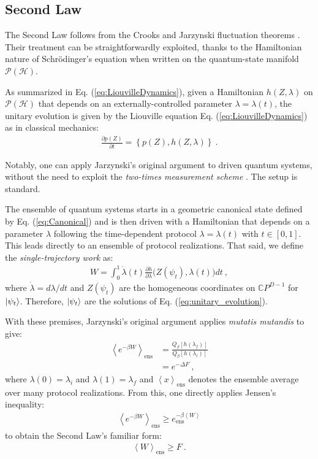 \documentclass[draft,nofootinbib,pre,twocolumn,showpacs,showkeys,groupaddress,preprintnumbers,floatfix]{revtex4-1}
\newcommand{\1}{\mathbbm{1}}
\newcommand{\MV}[1]{\left\langle #1 \right\rangle}
\newcommand{\PH}{\mathcal{P}(\mathcal{H})}
\begin{document}
\subsection{Second Law}

The Second Law follows from the Crooks \cite{Crooks1999a} and Jarzynski
\cite{Jarzynski2011} fluctuation theorems
\cite{Campisi,Klages2013,Deffner2019}. Their treatment can be straightforwardly
exploited, thanks to the Hamiltonian nature of Schr\"odinger's equation when
written on the quantum-state manifold $\PH$.

As summarized in Eq. (\ref{eq:LiouvilleDynamics}), given a Hamiltonian
$h(Z,\lambda)$ on $\PH$ that depends on an externally-controlled parameter
$\lambda = \lambda(t)$, the unitary evolution is given by the Liouville
equation Eq. (\ref{eq:LiouvilleDynamics}) as in classical mechanics:
\begin{align*}
\frac{\partial p(Z)}{\partial t} = \left\{p(Z) , h(Z,\lambda) \right\}
  ~.
\end{align*}

Notably, one can apply Jarzynski's original argument \cite{Jarzynski1997} to
driven quantum systems, without the need to exploit the \emph{two-times
measurement scheme} \cite{Deffner2019}. The setup is standard.

The ensemble of quantum systems starts in a geometric canonical state defined
by Eq. (\ref{eq:Canonical}) and is then driven with a Hamiltonian that depends
on a parameter $\lambda$ following the time-dependent protocol
$\lambda=\lambda(t)$ with $t \in [0,1]$. This leads directly to an ensemble of
protocol realizations. That said, we define the \emph{single-trajectory work}
as:
\begin{align*}
W = \int_{0}^{1} \dot{\lambda}(t) \frac{\partial h}{\partial \lambda}
 \big( Z(\psi_t),\lambda(t) \big)dt
  ~,
\end{align*}
where $\dot{\lambda} = d \lambda / dt$ and $Z(\psi_t)$ are the homogeneous
coordinates on $\mathbb{C}P^{D-1}$ for $\ket{\psi_t}$. Therefore,
$\ket{\psi_t}$ are the solutions of Eq. (\ref{eq:unitary_evolution}).

With these premises, Jarzynski's original argument applies \emph{mutatis
mutandis} to give:
\begin{align}
\MV{e^{-\beta W}}_{\mathrm{ens}}
  & = \frac{Q_\beta [h(\lambda_f)]}{Q_\beta [h(\lambda_i)]} \nonumber \\
  & = e^{-\Delta F}
  ~,
    \label{eq:Jarzynski}
\end{align}
where $\lambda(0) = \lambda_i$ and $\lambda(1)=\lambda_f$ and
$\MV{x}_{\mathrm{ens}}$ denotes the ensemble average over many protocol
realizations. From this, one directly applies Jensen's inequality:
\begin{align*}
\MV{e^{-\beta W}}_\text{ens}
   \geq e^{-\beta \MV{W}}_\text{ens}
\end{align*}
to obtain the Second Law's familiar form:
\begin{align}
\MV{W}_\text{ens} \geq F
  ~.
\label{eq:SecondLaw}
\end{align}
\end{document}

